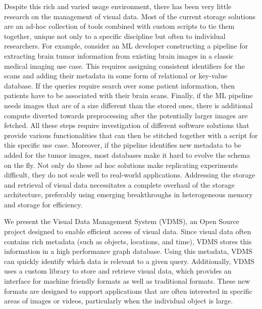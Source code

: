 Despite this rich and varied usage environment, there has been very little
research on the management of visual data.
Most of the current storage solutions are
an ad-hoc collection of tools combined with custom scripts to tie them
together, unique not only to a specific discipline but often to individual
researchers. For example, consider an ML developer constructing a pipeline
for extracting brain tumor information from existing brain images in a
classic medical imaging use case. This requires assigning consistent
identifiers for the scans and adding their metadata in
some form of relational or key-value database. If the queries require
search over some patient information, then patients have to be associated
with their brain scans. Finally, if the ML pipeline needs images that
are of a size different than the stored ones, there is additional compute
diverted towards preprocessing after the potentially larger images are
fetched. All these steps require investigation of different software
solutions that provide various functionalities that can then be stitched
together with a script for this specific use case.
Moreover, if the pipeline identifies
new metadata to be added for the tumor images, most databases make it
hard to evolve the schema on the fly.
Not only do these ad hoc solutions make replicating experiments
difficult, they do not scale well to real-world applications.
Addressing the storage and retrieval of visual data necessitates a complete
overhaul of the storage architecture,
preferably using emerging breakthroughs in
heterogeneous memory and storage for efficiency.

We present the Visual Data Management System (VDMS)\cite{darkside},
an Open Source project designed to enable efficient access of visual data.
Since visual data often contains
rich metadata (such as objects, locations, and time), VDMS stores this
information in a high performance graph database. Using this metadata, VDMS
can quickly identify which data is relevant to a given query.
Additionally, VDMS uses a custom library to store and retrieve visual data,
which provides an interface for machine friendly formats as well as
traditional formats. These new formats are designed to support applications
that are often interested in specific areas of images or videos,
particularly when the individual object is large.
